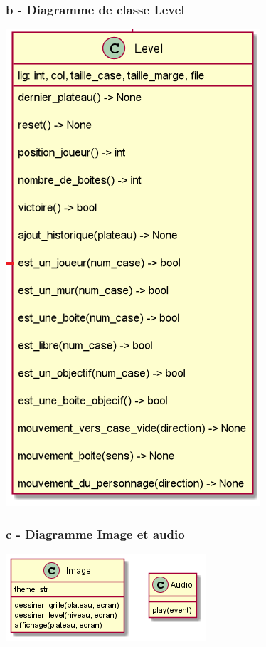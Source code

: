 \documentclass[a4paper,12pt]{article} %
\begin{document}
\subsubsection*{b - Diagramme de classe Level}
\label{Level}
\begin{center}
	\includegraphics[scale=0.5]{images/classe_level.png}
\end{center}

\subsubsection*{c - Diagramme Image et audio}
\label{multimedia}
\begin{center}
	\includegraphics[scale=1]{images/multimedia.png}
\end{center}
\end{document}
